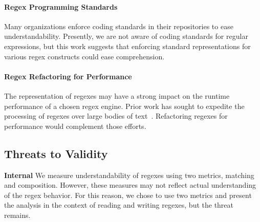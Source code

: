 %

\paragraph{Regex Programming Standards}
Many organizations enforce coding standards in their repositories to ease understandability.
Presently, we are not aware of coding standards for regular expressions, but this work suggests that enforcing standard representations for various regex constructs could ease comprehension.

\paragraph{Regex Refactoring for Performance}
The representation of regexes may have a strong impact on the runtime performance of a chosen regex engine. Prior work has sought to expedite the processing of regexes over large bodies of text~\cite{Baeza-Yates:1996:FTS:235809.235810}.
Refactoring regexes for performance would complement those efforts.

\subsection{Threats to Validity}

\textbf{Internal}
We measure understandability of regexes using two metrics, matching and composition. However, these measures may not reflect actual understanding of the regex behavior. For this reason, we chose to use two metrics and present the analysis in the context of reading and writing regexes, but the threat remains.

